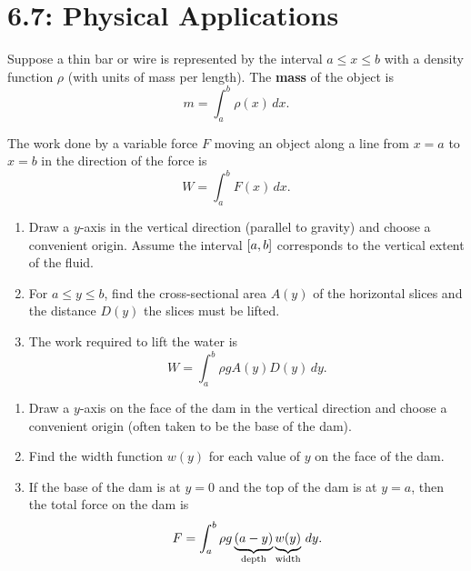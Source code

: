 \documentclass[../mathNotesPreamble]{subfiles}
\begin{document}
  \section{6.7: Physical Applications}

  \begin{defn*}
    Suppose a thin bar or wire is represented by the interval $a\leq x\leq b$ with a density function $\rho$ (with units of mass per length). The \textbf{mass} of the object is
      \[m=\int_a^b \rho(x)\,dx.\]
  \end{defn*}

  \begin{defn*}[Work]
    The work done by a variable force $F$ moving an object along a line from $x=a$ to $x=b$ in the direction of the force is
      \[W=\int_a^b F(x)\,dx.\]
  \end{defn*}


  \begin{thmBox*}
    \begin{enumerate}
      \item 
        Draw a $y$-axis in the vertical direction (parallel to gravity) and choose a convenient origin. Assume the interval ${\left[a,b\right]}$ corresponds to the vertical extent of the fluid.
      \item 
        For $a\leq y\leq b$, find the cross-sectional area $A(y)$ of the horizontal slices and the distance $D(y)$ the slices must be lifted.
      \item 
        The work required to lift the water is
          \[W=\int_a^b \rho gA(y)D(y)\,dy.\]
    \end{enumerate}
  \end{thmBox*}

  \begin{thmBox*}
    \begin{enumerate}
      \item 
        Draw a $y$-axis on the face of the dam in the vertical direction and choose a convenient origin (often taken to be the base of the dam).
      \item 
        Find the width function $w(y)$ for each value of $y$ on the face of the dam.
      \item 
        If the base of the dam is at $y=0$ and the top of the dam is at $y=a$, then the total force on the dam is
          \[F=\int_a^b \rho g\underbrace{(a-y)}_{\textnormal{depth}}\underbrace{w(y)}_{\textnormal{width}}\,dy.\]
    \end{enumerate}
  \end{thmBox*}
\end{document}
